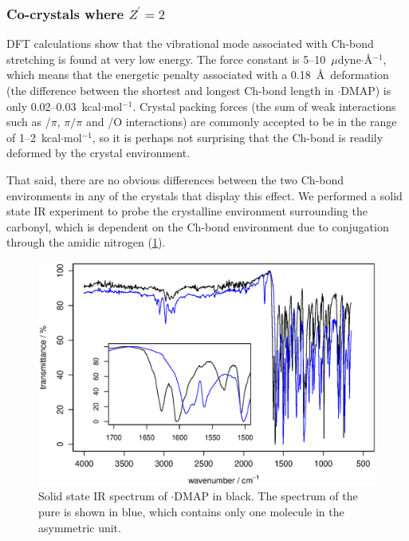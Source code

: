 \begin{refsection}
\subsubsection{Co-crystals where \texorpdfstring{$Z^\prime=2$}{Z'=2}}\label{sec:z2}
DFT calculations show that the vibrational mode associated with Ch-bond stretching is found at very low energy.
The force constant is 5--10~$\mu$dyne$ \cdot $\AA$^{-1}$, which means that the energetic penalty associated with a 0.18~\AA\ deformation (the difference between the shortest and longest Ch-bond length in $ \cdot $DMAP) is only 0.02--0.03~kcal$ \cdot $mol$^{-1}$.
Crystal packing forces (the sum of weak interactions such as /$\pi$, $\pi /\pi$ and /O interactions) are commonly accepted to be in the range of 1--2~kcal$ \cdot $mol$^{-1}$, so it is perhaps not surprising that the Ch-bond is readily deformed by the crystal environment.\autocite{Dunitz1988}

That said, there are no obvious differences between the two Ch-bond environments in any of the crystals that display this effect.
We performed a solid state IR experiment to probe the crystalline environment surrounding the carbonyl, which is dependent on the Ch-bond environment due to conjugation through the amidic nitrogen (\cref{fig:ebs-4oet-dmap-ir}).

\begin{figure}
    \centering
    \includegraphics[width=0.9\linewidth]{Figures/ebs-4oet-dmap-ir.eps}
    \caption[Solid state IR spectrum of $ \cdot $DMAP.]{Solid state IR spectrum of $ \cdot $DMAP in black. The spectrum of the pure  is shown in blue, which contains only one molecule in the asymmetric unit.}\label{fig:ebs-4oet-dmap-ir}
\end{figure}


\end{refsection}
